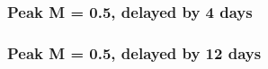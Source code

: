	\subsubsection{Peak M = 0.5, delayed by 4 days}
		\label{chap:sim_R2_4_1}
	\subsubsection{Peak M = 0.5, delayed by 12 days}
		\label{chap:sim_R2_4_3}
